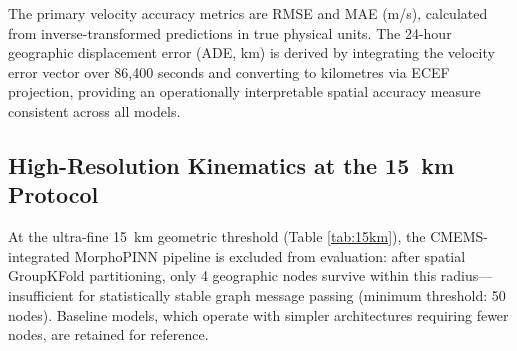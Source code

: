 \documentclass[conference]{IEEEtran}
\begin{document}
The primary velocity accuracy metrics are RMSE and MAE (m/s), calculated from inverse-transformed predictions in true physical units. The 24-hour geographic displacement error (ADE, km) is derived by integrating the velocity error vector over 86,400 seconds and converting to kilometres via ECEF projection, providing an operationally interpretable spatial accuracy measure consistent across all models.

\subsection{High-Resolution Kinematics at the 15~km Protocol}

\begin{table}[htbp]
\caption{Trajectory Divergence at the 15~km Protocol Boundary}
\label{tab:15km}
\begin{center}
\end{center}
\end{table}

At the ultra-fine 15~km geometric threshold (Table \ref{tab:15km}), the CMEMS-integrated MorphoPINN pipeline is excluded from evaluation: after spatial GroupKFold partitioning, only 4 geographic nodes survive within this radius---insufficient for statistically stable graph message passing (minimum threshold: 50 nodes). Baseline models, which operate with simpler architectures requiring fewer nodes, are retained for reference.
\end{document}
